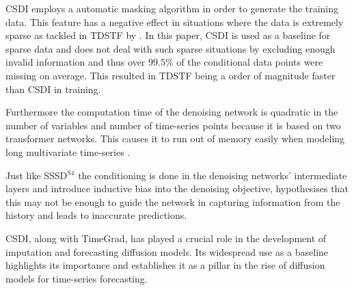 CSDI employs a automatic masking algorithm in order to generate the training data. This feature has a negative effect in situations where the data is extremely sparse as tackled in TDSTF by \textcite{chang_tdstf_2023}. In this paper, CSDI is used as a baseline for sparse data and does not deal with such sparse situations by excluding enough invalid information and thus over $99.5\%$ of the conditional data points were missing on average. This resulted in TDSTF being a order of magnitude faster than CSDI in training.

Furthermore the computation time of the denoising network is quadratic in the number of variables and number of time-series points because it is based on two transformer networks. This causes it to run out of memory easily when modeling long multivariate time-series \cite{shen_non-autoregressive_2023}.

Just like SSSD$^{\text{S4}}$ the conditioning is done in the denoising networks' intermediate layers and introduce inductive bias into the denoising objective, \textcite{shen_non-autoregressive_2023} hypothesises that this may not be enough to guide the network in capturing information from the history and leads to inaccurate predictions.

CSDI, along with TimeGrad, has played a crucial role in the development of imputation and forecasting diffusion models. Its widespread use as a baseline highlights its importance and establishes it as a pillar in the rise of diffusion models for time-series forecasting.